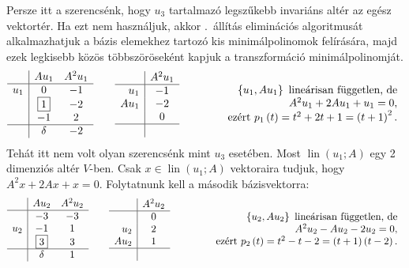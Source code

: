 \documentclass[9pt, a4paper, showtrims]{memoir}
\theoremstyle{plain}
\theoremstyle{remark}
\theoremstyle{definition}
\DeclareMathOperator{\lin}{lin}
\begin{document}
Persze itt a szerencsénk, hogy $u_3$ tartalmazó legszűkebb invariáns altér az egész vektortér.
Ha ezt nem használjuk, 
akkor .~állítás eliminációs algoritmusát alkalmazhatjuk a bázis elemekhez tartozó kis minimálpolinomok felírására, 
majd ezek legkisebb közös többszöröseként kapjuk a transzformáció minimálpolinomját.
\[
		\begin{array}{r|cc}
			    & Au_1          & A^2u_1 \\
			\hline
			u_1 &  0            &-1      \\
			    & \framebox{1}  &-2      \\
			    & -1            & 2      \\
			\hline
			    & \delta        &-2
		\end{array}
		\qquad
		\begin{array}{r|c}
			     & A^2u_1 \\
			\hline
			u_1  & -1     \\
			Au_1 & -2     \\
			     & 0      \\
			\hline
			     &
		\end{array}
		\qquad\qquad
		\begin{array}{r}
			\left\{ u_1,Au_1 \right\}\mbox{ lineárisan független, de} \\
			A^2u_1+2Au_1+u_1=0,                                        \\
			\mbox{ezért } p_1\left( t \right)=t^2+2t+1=\left( t+1 \right)^2.
		\end{array}
\]
Tehát itt nem volt olyan szerencsénk mint $u_3$ esetében.
Most $\lin\left( u_1;A \right)$ egy 2 dimenziós altér $V$-ben.
Csak $x\in\lin\left( u_1;A \right)$ vektoraira tudjuk, hogy $A^2x+2Ax+x=0$.
Folytatnunk kell a második bázisvektorra:
\[
		\begin{array}{r|cc}
			    & Au_2          & A^2u_2 \\
			\hline
			    & -3            &-3      \\
		   u_2  & -1            & 1      \\
                & \framebox{3}  & 3      \\
			\hline
			    & \delta        & 1
		\end{array}
		\qquad
		\begin{array}{r|c}
			     & A^2u_2 \\
			\hline
			     &  0     \\
			 u_2 &  2     \\
			Au_2 &  1     \\
			\hline
			     &
		\end{array}
		\qquad\qquad
		\begin{array}{r}
			\left\{ u_2,Au_2 \right\}\mbox{ lineárisan független, de} \\
			A^2u_2-Au_2-2u_2=0,                                        \\
			\mbox{ezért } p_2\left( t \right)=t^2-t-2=\left( t+1 \right)\left( t-2 \right).
		\end{array}
\]
\end{document}
